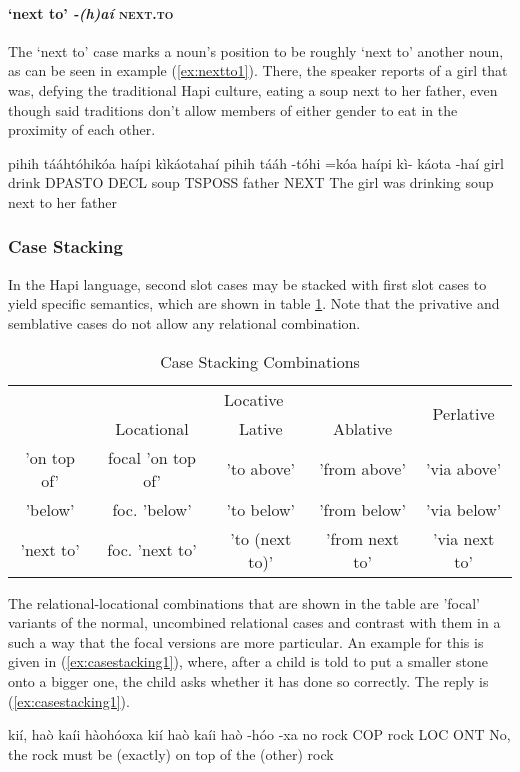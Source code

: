 \documentclass[a4paper, 12pt, oneside]{memoir}
\newcommand{\emh}[1]{\textit{#1}}
\begin{document}
\paragraph{`next to' \emh{-(h)aí} \textsc{next.to}}
The `next to' case marks a noun's position to be roughly `next to' another noun, as can be seen in example (\ref{ex:nextto1}). There, the speaker reports of a girl that was, defying the traditional Hapi culture, eating a soup next to her father, even though said traditions don't allow members of either gender to eat in the proximity of each other.
\begin{examples}
\ex \label{ex:nextto1}
\words pihih tááhtóhikóa haípi kìkáotahaí
\bits pihih tááh -tóhi =kóa haípi kì- káota -haí
\gloss girl drink DPASTO DECL soup TSPOSS father NEXT
\tr The girl was drinking soup next to her father
\end{examples}
\subsubsection{Case
Stacking}\label{scasestacking}
In the Hapi language, second slot cases may be stacked with first slot cases to yield specific semantics, which are shown in table \ref{t:casestacking}. Note that the privative and semblative cases do not allow any relational combination.
\begin{table}[H]
\begin{tabular}{@{}ccccc@{}}
\toprule
\multirow{2}{*}{} & \multicolumn{3}{c}{Locative}                        & \multirow{2}{*}{Perlative} \\ \cmidrule(lr){2-4}
                  & Locational        & Lative         & Ablative       &                            \\ \midrule
'on top of'       & focal 'on top of' & 'to above'     & 'from above'   & 'via above'                \\
'below'           & foc. 'below'      & 'to below'     & 'from below'   & 'via below'                \\
'next to'         & foc. 'next to'    & 'to (next to)' & 'from next to' & 'via next to'              \\ \bottomrule
\end{tabular}
\caption{Case Stacking Combinations}
\label{t:casestacking}
\end{table}
The relational-locational combinations that are shown in the table are 'focal' variants of the normal, uncombined relational cases and contrast with them in a such a way that the focal versions are more particular. An example for this is given in (\ref{ex:casestacking1}), where, after a child is told to put a smaller stone onto a bigger one, the child asks whether it has done so correctly. The reply is (\ref{ex:casestacking1}).
\begin{examples}
\ex \label{ex:casestacking1}
\words kií, haò kaíi hàohóoxa
\bits kií haò kaíi haò -hóo -xa
\gloss no rock COP rock LOC ONT
\tr No, the rock must be (exactly) on top of the (other) rock
\end{examples}
\end{document}
